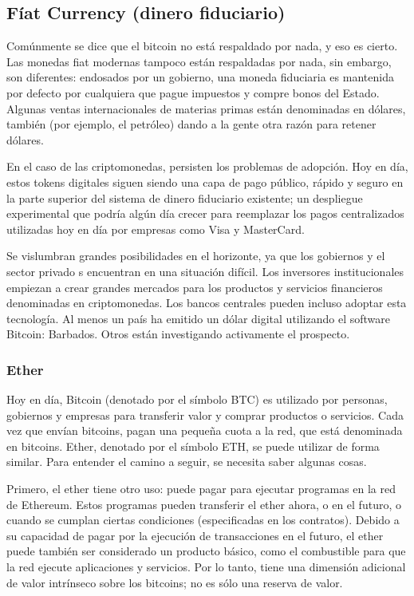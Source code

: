 \subsection{Fíat Currency (dinero fiduciario)}
Comúnmente se dice que el bitcoin no está respaldado por nada, y eso es cierto. Las monedas fiat
modernas tampoco están respaldadas por nada, sin embargo, son diferentes: endosados
por un gobierno, una moneda fiduciaria es mantenida por defecto por cualquiera que pague impuestos
y compre bonos del Estado. Algunas ventas internacionales de materias primas están denominadas en
dólares, también (por ejemplo, el petróleo) dando a la gente otra razón para retener dólares.

En el caso de las criptomonedas, persisten los problemas de adopción. Hoy en día, estos tokens
digitales siguen siendo una capa de pago público, rápido y seguro en la parte superior del sistema
de dinero fiduciario existente; un despliegue experimental que podría algún día crecer para
reemplazar los pagos centralizados utilizadas hoy en día por empresas como Visa y MasterCard.

Se vislumbran grandes posibilidades en el horizonte, ya que los gobiernos y el sector privado s
encuentran en una situación difícil. Los inversores institucionales empiezan a crear grandes
mercados para los productos y servicios financieros denominadas en criptomonedas. Los bancos
centrales pueden incluso adoptar esta tecnología. Al menos un país ha emitido un dólar digital
utilizando el software Bitcoin: Barbados. Otros están investigando activamente el prospecto.


\subsubsection{Ether}
Hoy en día, Bitcoin (denotado por el símbolo BTC) es utilizado por personas, gobiernos y empresas
para transferir valor y comprar productos o servicios. Cada vez que envían bitcoins, pagan una
pequeña cuota a la red, que está denominada en bitcoins. Ether, denotado por el símbolo ETH, se
puede utilizar de forma similar. Para entender el camino a seguir, se necesita saber algunas cosas.

Primero, el ether tiene otro uso: puede pagar para ejecutar programas en la red de Ethereum.
Estos programas pueden transferir el ether ahora, o en el futuro, o cuando se cumplan ciertas
condiciones (especificadas en los contratos).
Debido a su capacidad de pagar por la ejecución de transacciones en el futuro, el ether puede
también ser considerado un producto básico, como el combustible para que la red ejecute
aplicaciones y servicios. Por lo tanto, tiene una dimensión adicional de valor intrínseco sobre los
bitcoins; no es sólo una reserva de valor.

